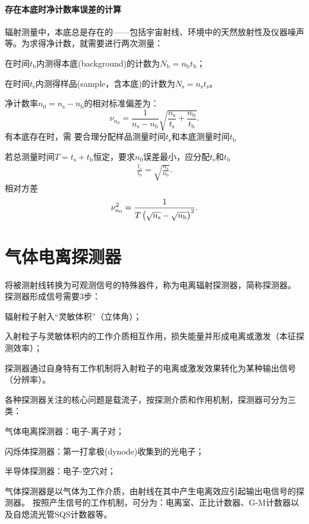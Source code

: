 \paragraph{存在本底时净计数率误差的计算}辐射测量中，本底总是存在的——包括宇宙射线、环境中的天然放射性及仪器噪声等。为求得净计数，就需要进行两次测量：
\begin{compactitem}
	\item 在时间$t_\mathrm b$内测得本底(background)的计数为$N_\mathrm b=n_\mathrm bt_\mathrm b$；
	\item 在时间$t_\mathrm s$内测得样品(sample，含本底)的计数为$N_\mathrm s=n_\mathrm st_\mathrm s$。
\end{compactitem}
净计数率$n_0=n_\mathrm s-n_\mathrm b$的相对标准偏差为：
\[
	\nu_{n_0}=\frac1{n_\mathrm s-n_\mathrm b}\sqrt{\frac{n_\mathrm s}{t_\mathrm s}+\frac{n_\mathrm b}{t_\mathrm b}}.
\]
有本底存在时，需 要合理分配样品测量时间$t_\mathrm s$和本底测量时间$t_\mathrm b$

若总测量时间$T=t_\mathrm s+t_\mathrm b$恒定，要求$n_0$误差最小，应分配$t_\mathrm s$和$t_\mathrm b$
\begin{align}
	\frac{t_\mathrm s}{t_\mathrm b}=\sqrt{\frac{n_\mathrm s}{n_\mathrm b}}.
\end{align}
相对方差
\begin{align}
	\nu_{n_0}^2=\frac1{T\left(\sqrt{n_\mathrm s}-\sqrt{n_\mathrm b}\right)^2}.
\end{align}
\clearpage
\section{气体电离探测器}
将被测射线转换为可观测信号的特殊器件，称为电离辐射探测器，简称探测器。
探测器形成信号需要3步：
\begin{compactenum}
	\item 辐射粒子射入“灵敏体积”（立体角）；
	\item 入射粒子与灵敏体积内的工作介质相互作用，损失能量并形成电离或激发（本征探测效率）；
	\item 探测器通过自身特有工作机制将入射粒子的电离或激发效果转化为某种输出信号（分辨率）。
\end{compactenum}

各种探测器关注的核心问题是载流子，按探测介质和作用机制，探测器可分为三类：
\begin{compactitem}
	\item 气体电离探测器：电子-离子对；
	\item 闪烁体探测器：第一打拿极(dynode)收集到的光电子；
	\item 半导体探测器：电子-空穴对；
\end{compactitem}
气体探测器是以气体为工作介质，由射线在其中产生电离效应引起输出电信号的探测器。
按照产生信号的工作机制，可分为：电离室、正比计数器、G-M计数器以及自熄流光管SQS计数器等。
